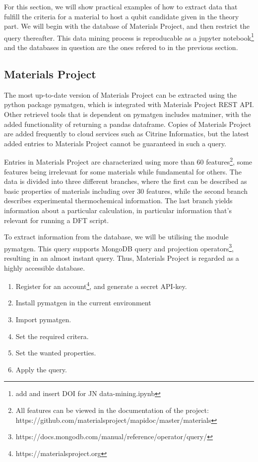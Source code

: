 For this section, we will show practical examples of how to extract data that fulfill the criteria for a material to host a qubit candidate given in the theory part. We will begin with the database of Materials Project, and then restrict the query thereafter. This data mining process is reproducable as a jupyter notebook\footnote{add and insert DOI for JN data-mining.ipynb} and the databases in question are the ones refered to in the previous section.

\subsection{Materials Project }

The most up-to-date version of Materials Project can be extracted using the python package pymatgen, which is integrated with Materials Project REST API. Other retrievel tools that is dependent on pymatgen includes matminer, with the added functionality of returning a pandas dataframe. Copies of Materials Project are added frequently to cloud services such as Citrine Informatics, but the latest added entries to Materials Project cannot be guaranteed in such a query.

Entries in Materials Project are characterized using more than 60 features\footnote{All features can be viewed in the documentation of the project: https://github.com/materialsproject/mapidoc/master/materials}, some features being irrelevant for some materials while fundamental for others. The data is divided into three different branches, where the first can be described as basic properties of materials including over $30$ features, while the second branch describes experimental thermochemical information. The last branch yields information about a particular calculation, in particular information that's relevant for running a DFT script.

To extract information from the database, we will be utilising the module pymatgen. This query supports MongoDB query and projection operators\footnote{https://docs.mongodb.com/manual/reference/operator/query/}, resulting in an almost instant query. Thus, Materials Project is regarded as a highly accessible database.

\begin{enumerate}
  \item Register for an account\footnote{https://materialsproject.org}, and generate a secret API-key.
  \item Install pymatgen in the current environment
  \item Import pymatgen.
  \item Set the required critera.
  \item Set the wanted properties.
  \item Apply the query.
\end{enumerate}


